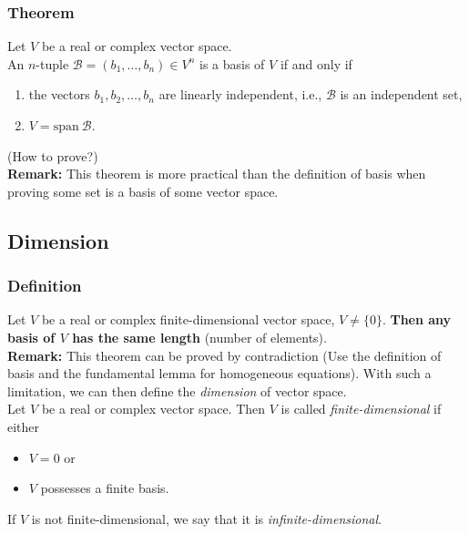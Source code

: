 \documentclass{beamer}
\renewcommand{\emph}[1]{{\color{Turquoise3}\textsl{#1}}}
\newcommand{\myseries}[2]{$#1_1,#1_2,\dots,#1_#2$}
\newcommand{\nullspace}{~\\[15pt]}
\begin{document}
\begin{frame}
    \frametitle{Theorem}
    Let $V$ be a real or complex vector space.\\ An $n$-tuple $\mathcal{B}=(b_1,\ldots,b_n)\in V^n$ is a basis of $V$ if and only if
    \begin{enumerate}
        \item the vectors \myseries{b}{n} are linearly independent, i.e., $\mathcal{B}$ is an independent set,
        \item $V=\text{span}~\mathcal{B}.$
    \end{enumerate}
    (How to prove?)
    \nullspace
    \textbf{Remark:} This theorem is more practical than the definition of basis when proving some set is a basis of some vector space.
\end{frame}

\subsection{Dimension}
\begin{frame}
    \frametitle{Definition}
    Let $V$ be a real or complex finite-dimensional vector space, $V\neq\{0\}$. \textbf{Then any basis of $V$ has the same length }(number of elements).
    \nullspace
    \textbf{Remark:} This theorem can be proved by contradiction (Use the definition of basis and the fundamental lemma for homogeneous equations). With such a limitation, we can then define the \emph{dimension} of vector space.
    \nullspace
    Let $V$ be a real or complex vector space. Then $V$ is called \emph{finite-dimensional} if either
    \begin{itemize}
        \item $V={0}$ or
        \item $V$ possesses a finite basis.
    \end{itemize}
    If $V$ is not finite-dimensional, we say that it is \emph{infinite-dimensional}.
\end{frame}
\end{document}
